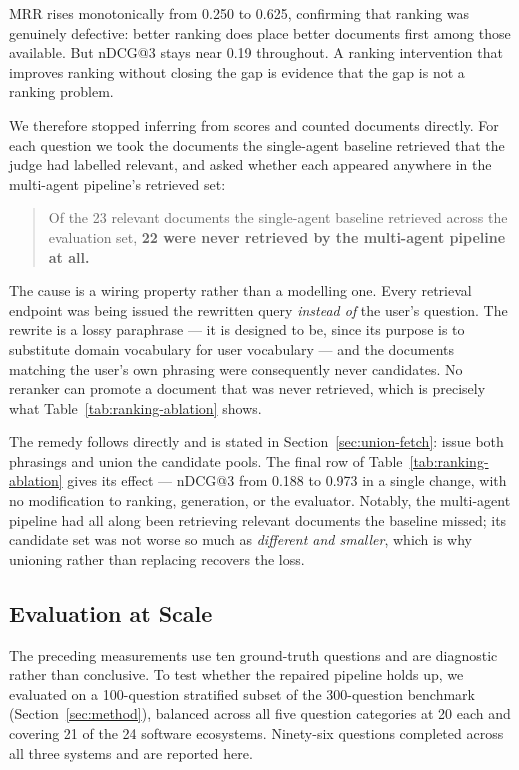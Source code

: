 MRR rises monotonically from 0.250 to 0.625, confirming that ranking was
genuinely defective: better ranking does place better documents first among
those available. But nDCG@3 stays near 0.19 throughout. A ranking intervention
that improves ranking without closing the gap is evidence that the gap is not a
ranking problem.

We therefore stopped inferring from scores and counted documents directly. For
each question we took the documents the single-agent baseline retrieved that the
judge had labelled relevant, and asked whether each appeared anywhere in the
multi-agent pipeline's retrieved set:

\begin{quote}
Of the 23 relevant documents the single-agent baseline retrieved across the
evaluation set, \textbf{22 were never retrieved by the multi-agent pipeline at
all.}
\end{quote}

The cause is a wiring property rather than a modelling one. Every retrieval
endpoint was being issued the rewritten query \emph{instead of} the user's
question. The rewrite is a lossy paraphrase --- it is designed to be, since its
purpose is to substitute domain vocabulary for user vocabulary --- and the
documents matching the user's own phrasing were consequently never candidates.
No reranker can promote a document that was never retrieved, which is precisely
what Table~\ref{tab:ranking-ablation} shows.

The remedy follows directly and is stated in Section~\ref{sec:union-fetch}: issue
both phrasings and union the candidate pools. The final row of
Table~\ref{tab:ranking-ablation} gives its effect --- nDCG@3 from 0.188 to 0.973
in a single change, with no modification to ranking, generation, or the
evaluator. Notably, the multi-agent pipeline had all along been retrieving
relevant documents the baseline missed; its candidate set was not worse so much
as \emph{different and smaller}, which is why unioning rather than replacing
recovers the loss.

\subsection{Evaluation at Scale}\label{sec:scaled-eval}

The preceding measurements use ten ground-truth questions and are diagnostic
rather than conclusive. To test whether the repaired pipeline holds up, we
evaluated on a 100-question stratified subset of the 300-question benchmark
(Section~\ref{sec:method}), balanced across all five question categories at 20
each and covering 21 of the 24 software ecosystems. Ninety-six questions
completed across all three systems and are reported here.

